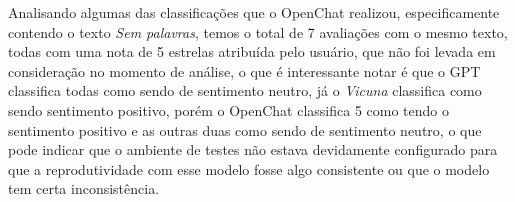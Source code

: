Analisando algumas das classificações que o OpenChat realizou, especificamente contendo o texto \textit{Sem palavras}, temos o total de 7 avaliações com o mesmo texto, todas com uma nota de 5 estrelas atribuída pelo usuário, que não foi levada em consideração no momento de análise, o que é interessante notar é que o GPT classifica todas como sendo de sentimento neutro, já o \textit{Vicuna} classifica como sendo sentimento positivo, porém o OpenChat classifica 5 como tendo o sentimento positivo e as outras duas como sendo de sentimento neutro, o que pode indicar que o ambiente de testes não estava devidamente configurado para que a reprodutividade com esse modelo fosse algo consistente ou que o modelo tem certa inconsistência.
